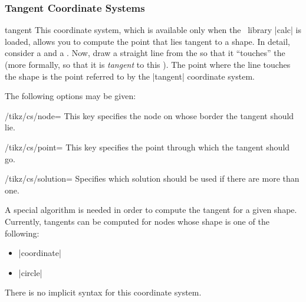 \subsubsection{Tangent Coordinate Systems}

\begin{coordinatesystem}{tangent}
    This coordinate system, which is available only when the \tikzname\ library
    |calc| is loaded, allows you to compute the point that lies tangent to a
    shape. In detail, consider a  and a . Now, draw a
    straight line from the  so that it ``touches'' the 
    (more formally, so that it is \emph{tangent} to this ). The
    point where the line touches the shape is the point referred to by the
    |tangent| coordinate system.

    The following options may be given:
    \begin{key}{/tikz/cs/node=}
        This key specifies the node on whose border the tangent should lie.
    \end{key}
    \begin{key}{/tikz/cs/point=}
        This key specifies the point through which the tangent should go.
    \end{key}
    \begin{key}{/tikz/cs/solution=}
        Specifies which solution should be used if there are more than one.
    \end{key}

    A special algorithm is needed in order to compute the tangent for a given
    shape. Currently, tangents can be computed for nodes whose shape is one of
    the following:
    \begin{itemize}
        \item |coordinate|
        \item |circle|
    \end{itemize}
\begin{codeexample}[preamble={\usetikzlibrary{calc}}]
\end{codeexample}

    There is no implicit syntax for this coordinate system.
\end{coordinatesystem}


